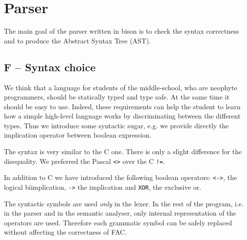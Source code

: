 \section{Parser}
\label{sec:parser}
The main goal of the parser written in bison is to check the
syntax correctness and to produce the Abstract Syntax Tree (AST). 

\subsection{F -- Syntax choice}
We think that a language for students of the middle-school,
who are neophyte programmers, should be statically typed and type safe. 
At the same time it should be easy to use. 
Indeed, these requirements can help the student to learn how a simple 
high-level language works by discriminating between the different types.
Thus we introduce some syntactic sugar, e.g. we 
provide directly the implication operator between boolean expression.

The syntax is very similar to the C one. There is only a slight difference
for the disequality. We preferred the Pascal \verb|<>| over the C \verb|!=|. 

In addition to C we have introduced the following
boolean operators: \verb|<->|, the logical biimplication, 
\verb|->| the implication and \verb|XOR|, the exclusive or.

The syntactic symbols are used \emph{only} in the lexer. In the
rest of the program, i.e. in the parser and in the semantic analyser, only
internal representation of the operators are used. Therefore each grammatic
symbol can be safely replaced without affecting the correctness of FAC.



